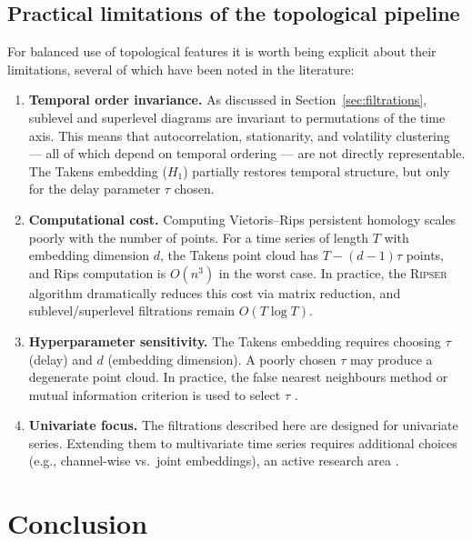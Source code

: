 \documentclass[12pt, a4paper]{article}
\theoremstyle{definition}
\theoremstyle{plain}
\begin{document}
\subsection*{Practical limitations of the topological pipeline}

For balanced use of topological features it is worth being explicit about their
limitations, several of which have been noted in the literature:

\begin{enumerate}
  \item \textbf{Temporal order invariance.} As discussed in
    Section~\ref{sec:filtrations}, sublevel and superlevel diagrams are invariant
    to permutations of the time axis. This means that autocorrelation, stationarity,
    and volatility clustering — all of which depend on temporal ordering — are not
    directly representable. The Takens embedding ($H_1$) partially restores temporal
    structure, but only for the delay parameter $\tau$ chosen.

  \item \textbf{Computational cost.} Computing Vietoris--Rips persistent homology
    scales poorly with the number of points. For a time series of length $T$ with
    embedding dimension $d$, the Takens point cloud has $T - (d-1)\tau$ points, and
    Rips computation is $O(n^3)$ in the worst case. In practice, the
    \textsc{Ripser} algorithm \citep{bauer2021ripser} dramatically reduces this cost
    via matrix reduction, and sublevel/superlevel filtrations remain $O(T \log T)$.

  \item \textbf{Hyperparameter sensitivity.} The Takens embedding requires choosing
    $\tau$ (delay) and $d$ (embedding dimension). A poorly chosen $\tau$ may produce
    a degenerate point cloud. In practice, the false nearest neighbours method or
    mutual information criterion is used to select $\tau$ \citep{takens1981detecting,
    perea2015sliding}.

  \item \textbf{Univariate focus.} The filtrations described here are designed for
    univariate series. Extending them to multivariate time series requires additional
    choices (e.g., channel-wise vs.\ joint embeddings), an active research area
    \citep{elyaagoubi2023multivariate, zheng2024multivariate}.
\end{enumerate}

\section{Conclusion}
\end{document}
